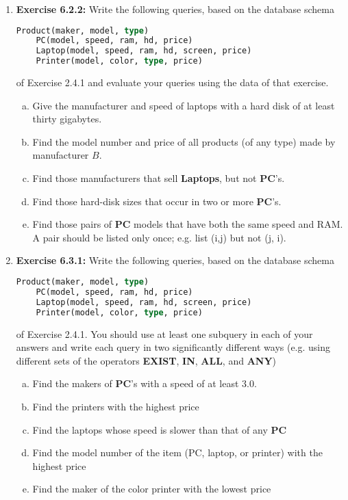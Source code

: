\documentclass[12pt]{article}
\begin{document}
\begin{enumerate}[1.]
    \item \textbf{Exercise 6.2.2:} Write the following queries, based on the database
    schema

    \begin{lstlisting}[language=SQL]
    Product(maker, model, type)
    PC(model, speed, ram, hd, price)
    Laptop(model, speed, ram, hd, screen, price)
    Printer(model, color, type, price)
    \end{lstlisting}

    \bigskip

    of Exercise 2.4.1 and evaluate your queries using the data of that exercise.

    \bigskip

    \begin{enumerate}[a)]
        \item Give the manufacturer and speed of laptops with a hard disk of at least
        thirty gigabytes.
        \item Find the model number and price of all products (of any type) made by
        manufacturer $B$.
        \item Find those manufacturers that sell \textbf{Laptops}, but not \textbf{PC}'s.
        \item Find those hard-disk sizes that occur in two or more \textbf{PC}'s.
        \item Find those pairs of \textbf{PC} models that have both the same speed
        and RAM. A pair should be listed only once; e.g. list (i,j) but not (j, i).
    \end{enumerate}

    \item \textbf{Exercise 6.3.1:} Write the following queries, based on the database schema

    \begin{lstlisting}[language=SQL]
    Product(maker, model, type)
    PC(model, speed, ram, hd, price)
    Laptop(model, speed, ram, hd, screen, price)
    Printer(model, color, type, price)
    \end{lstlisting}

    \bigskip

    of Exercise 2.4.1. You should use at least one subquery in each of your answers
    and write each query in two significantly different ways (e.g. using different
    sets of the operators \textbf{EXIST}, \textbf{IN}, \textbf{ALL}, and \textbf{ANY})

    \bigskip

    \begin{enumerate}[a)]
        \item Find the makers of \textbf{PC}'s with a speed of at least 3.0.
        \item Find the printers with the highest price
        \item Find the laptops whose speed is slower than that of any \textbf{PC}
        \item Find the model number of the item (PC, laptop, or printer) with the
        highest price
        \item Find the maker of the color printer with the lowest price
    \end{enumerate}


\end{enumerate}
\end{document}
